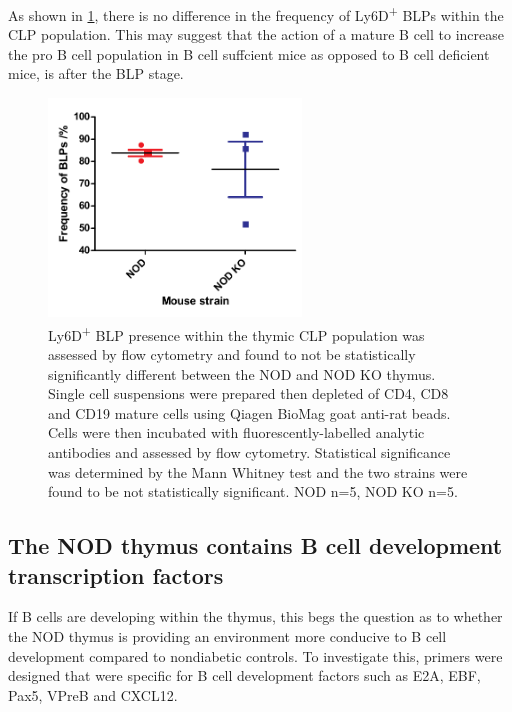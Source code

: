 As shown in \cref{fig:olderBLPs}, there is no difference in the frequency of Ly6D\textsuperscript{+} BLPs within the CLP population.
This may suggest that the action of a mature B cell to increase the pro B cell population in B cell suffcient mice as opposed to B cell deficient mice, is after the BLP stage.

\begin{figure}
\centering
\includegraphics[width=0.6\textwidth]{Figures/NODvKOBLPs.pdf}
\caption[The frequency of thymic BLPs is the same in both NOD and NOD KO thymi]{Ly6D\textsuperscript{+} BLP presence within the thymic CLP population was assessed by flow cytometry and found to not be statistically significantly different between the NOD and NOD KO thymus. Single cell suspensions were prepared then depleted of CD4, CD8 and CD19 mature cells using Qiagen BioMag goat anti-rat beads. Cells were then incubated with fluorescently-labelled analytic antibodies and assessed by flow cytometry.
Statistical significance was determined by the Mann Whitney test and the two strains were found to be not statistically significant. NOD n=5, NOD KO n=5.}
\label{fig:olderBLPs}
\end{figure}


\subsection{The NOD thymus contains B cell development transcription factors}
\label{subsec:TFs}

If B cells are developing within the thymus, this begs the question as to whether the NOD thymus is providing an environment more conducive to B cell development compared to nondiabetic controls. 
To investigate this, primers were designed that were specific for B cell development factors such as E2A, EBF, Pax5, VPreB and CXCL12.

